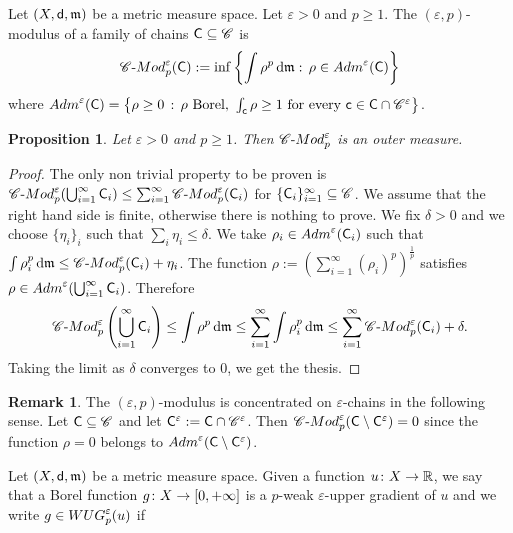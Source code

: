 \documentclass[12pt]{amsart}
\newcommand{\sfd}{{\sf d}}
\renewcommand{\d}{{\mathrm d}}
\newcommand{\X}{{\rm X}}
\newcommand{\mm}{\mathfrak m}
\newtheorem{proposition}[theorem]{Proposition}
\theoremstyle{definition}
\newtheorem{remark}[theorem]{Remark}
\newcommand{\cModepsilon}[2]{{\mathscr C}\text{-}{\rm Mod}_{#2}^{#1}}
\newcommand{\sfc}{{\sf c}}
\newcommand{\sfC}{{\sf C}}
\newcommand{\Chain}[1]{\mathscr{C}^{#1}}
\newcommand{\WUG}[2]{{\rm WUG}_{#1}^{#2}}
\begin{document}
Let $(\X,\sfd,\mm)$ be a metric measure space.
Let $\varepsilon > 0$ and $p\ge 1$. The $(\varepsilon, p)$-modulus of a family of chains $\sfC \subseteq \Chain{}$ is
\begin{equation*}
    \cModepsilon{\varepsilon}{p}({\sf C}):=\inf \left\{ \int \rho^p\,\d\mm:\, \rho \in {\rm Adm}^{\varepsilon}({\sfC})\right\}
\end{equation*}
where ${\rm Adm}^{\varepsilon}({\sfC})=\left\{ \rho \ge 0\,:\, \rho \text{ Borel, }\int_{\sfc} \rho \ge 1 \text{ for every } \sfc \in {\sfC} \cap \Chain{\varepsilon} \right\}$.
%
\begin{proposition}
\label{prop:outer_measure}
    Let $\varepsilon > 0$ and $p\ge 1$. Then $\cModepsilon{\varepsilon}{p}$ is an outer measure.
\end{proposition}
%
\begin{proof}
    The only non trivial property to be proven is $\cModepsilon{\varepsilon}{p}(\bigcup_{i=1}^\infty \sfC_i)\le \sum_{i=1}^\infty \cModepsilon{\varepsilon}{p}(\sfC_i)$ for $\{\sfC_i\}_{i=1}^\infty \subseteq \Chain{}$. We assume that the right hand side is finite, otherwise there is nothing to prove. 
    We fix $\delta>0$ and we choose $\{\eta_i\}_i$ such that $\sum_{i}\eta_i \le \delta$.
    We take $\rho_i \in {\rm Adm}^{\varepsilon}(\sfC_i)$ such that 
    $\int \rho_i^p \,\d \mm \le \cModepsilon{\varepsilon}{p}(\sfC_i) + \eta_i$.
    The function $\rho:=(\sum_{i=1}^\infty (\rho_i)^p)^{\frac{1}{p}}$ satisfies $\rho \in {\rm Adm}^{\varepsilon}(\bigcup_{i=1}^\infty \sfC_i)$. Therefore
    \begin{equation*}
        \cModepsilon{\varepsilon}{p}\left(\bigcup_{i=1}^\infty \sfC_i\right)\le \int \rho^p\,\d \mm \le \sum_{i=1}^\infty \int \rho_i^p\,\d \mm \le \sum_{i=1}^\infty \cModepsilon{\varepsilon}{p}(\sfC_i) +\delta.
    \end{equation*}
    Taking the limit as $\delta$ converges to $0$, we get the thesis.
\end{proof}
%
\begin{remark}
    The $(\varepsilon, p)$-modulus is concentrated on $\varepsilon$-chains in the following sense.
    Let $\sfC \subseteq \Chain{}$ and let $\sfC^\varepsilon := \sfC \cap \Chain{\varepsilon}$. Then $\cModepsilon{\varepsilon}{p}(\sfC \setminus \sfC^\varepsilon) = 0$ since the function $\rho=0$ belongs to ${\rm Adm}^{\varepsilon}({\sfC}\setminus {\sfC}^\varepsilon)$.
\end{remark}
%
    Let $(\X,\sfd,\mm)$ be a metric measure space. Given a function $u \colon \X \to \mathbb{R}$, we say that a Borel function $g \colon \X \to [0,+\infty]$ is a $p$-weak $\varepsilon$-upper gradient of $u$ and we write $g \in \WUG{p}{\varepsilon}(u)$ if
\end{document}
